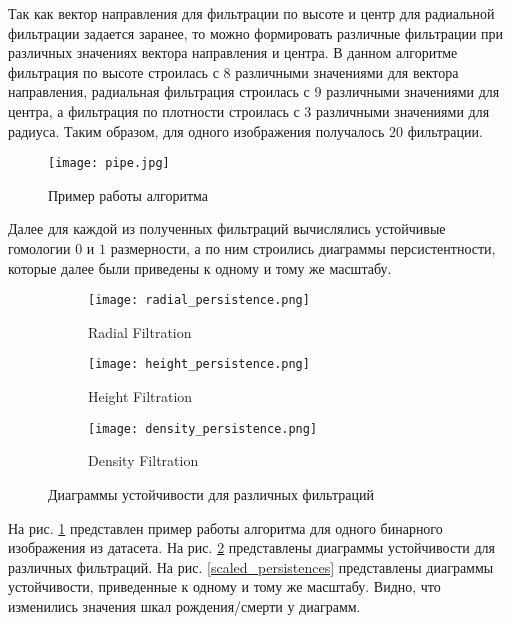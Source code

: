 Так как вектор направления для фильтрации по высоте и центр для радиальной фильтрации задается заранее, то можно формировать различные фильтрации при различных значениях вектора направления и центра. В данном алгоритме фильтрация по высоте строилась с $8$ различными значениями для вектора направления, радиальная фильтрация строилась с $9$ различными значениями для центра, а фильтрация по плотности строилась с $3$ различными значениями для радиуса. Таким образом, для одного изображения получалось $20$ фильтрации.

\begin{figure}[!htbp]
	\begin{center}
		\texttt{[image: pipe.jpg]}\\
		\caption{Пример работы алгоритма}
		\label{example}
	\end{center}
\end{figure}

Далее для каждой из полученных фильтраций вычислялись устойчивые гомологии $0$ и $1$ размерности, а по ним строились диаграммы персистентности, которые далее были приведены к одному и тому же масштабу. 

\begin{figure}[!htbp]
	\begin{subfigure}{.33\textwidth}
		\centering
		\texttt{[image: radial\_persistence.png]}\\
		\caption{Radial Filtration}
	\end{subfigure}%
	\begin{subfigure}{.33\textwidth}
		\centering
		\texttt{[image: height\_persistence.png]}\\
		\caption{Height Filtration}
	\end{subfigure}%
	\begin{subfigure}{.33\textwidth}
		\centering
		\texttt{[image: density\_persistence.png]}\\
		\caption{Density Filtration}
	\end{subfigure}%
	\caption{Диаграммы устойчивости для различных фильтраций}
	\label{persistences}
\end{figure}

 На рис. \ref{example} представлен пример работы алгоритма для одного бинарного изображения из датасета. На рис. \ref{persistences} представлены диаграммы устойчивости для различных фильтраций. На рис. \ref{scaled_persistences} представлены диаграммы устойчивости, приведенные к одному и тому же масштабу. Видно, что изменились значения шкал рождения/смерти у диаграмм.


